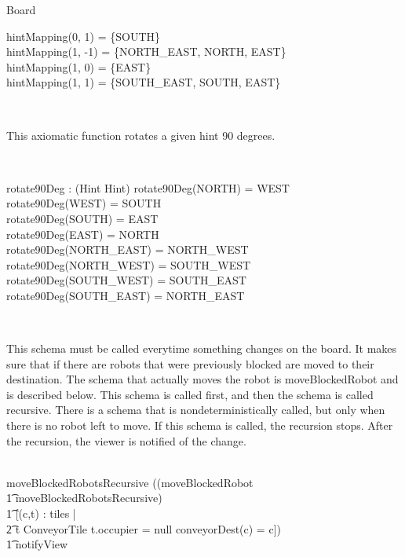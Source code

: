 \begin{class}{Board}
\begin{axdef}
hintMapping(0, 1) = \{SOUTH\} \\
hintMapping(1, -1) = \{NORTH\_EAST, NORTH, EAST\} \\
hintMapping(1, 0) = \{EAST\} \\
hintMapping(1, 1) = \{SOUTH\_EAST, SOUTH, EAST\} \\
\end{axdef} \\
\znewpage
\begin{zpar}
This axiomatic function rotates a given hint 90 degrees.
\end{zpar} \\
\begin{axdef}
rotate90Deg : \power (Hint \fun Hint)
\where
rotate90Deg(NORTH) = WEST \\
rotate90Deg(WEST) = SOUTH \\
rotate90Deg(SOUTH) = EAST \\
rotate90Deg(EAST) = NORTH \\
rotate90Deg(NORTH\_EAST) = NORTH\_WEST \\
rotate90Deg(NORTH\_WEST) = SOUTH\_WEST \\
rotate90Deg(SOUTH\_WEST) = SOUTH\_EAST \\
rotate90Deg(SOUTH\_EAST) = NORTH\_EAST
\end{axdef} \\
\begin{zpar}
This schema must be called everytime something changes on the board. It makes sure that if there are robots that were previously blocked are moved to their destination. The schema that actually moves the robot is moveBlockedRobot and is described below. This schema is called first, and then the schema is called recursive. There is a schema that is nondeterministically called, but only when there is no robot left to move. If this schema is called, the recursion stops. After the recursion, the viewer is notified of the change.
\end{zpar} \\
moveBlockedRobotsRecursive \sdef ((moveBlockedRobot \; \; \comp \\ \t1 moveBlockedRobotsRecursive) \; \; [] \\ \t1 [\neg \exists (c,t) : tiles | \\ \t2 t \in ConveyorTile \wedge t.occupier \not = null \wedge conveyorDest(c) = c]) \; \; \comp \\ \t1 notifyView \\
\also \also \also
\begin{zpar}

\end{zpar}
\end{class}
